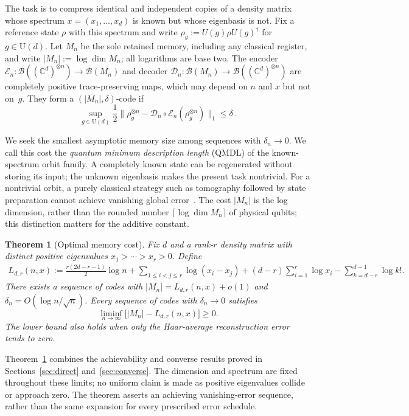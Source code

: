 \documentclass[a4paper,onecolumn,11pt]{quantumarticle}
\newtheorem{thm}{Theorem}
\def\D{\mathcal{D}}
\def\E{\mathcal{E}}
\begin{document}
The task is to compress identical and independent copies of a density matrix whose spectrum $x=(x_1,\ldots,x_d)$ is known but whose eigenbasis is not. Fix a reference state $\rho$ with this spectrum and write $\rho_g:=U(g)\rho U(g)^\dagger$ for $g\in\mathrm U(d)$. Let $M_n$ be the sole retained memory, including any classical register, and write $|M_n|:=\log\dim M_n$; all logarithms are base two. The encoder $\E_n:\mathcal B((\mathbb C^d)^{\otimes n})\to\mathcal B(M_n)$ and decoder $\D_n:\mathcal B(M_n)\to\mathcal B((\mathbb C^d)^{\otimes n})$ are completely positive trace-preserving maps, which may depend on $n$ and $x$ but not on~$g$. They form a $(|M_n|,\delta)$-code if
\begin{equation}\label{eq:error}
   \sup_{g\in\mathrm U(d)}\frac12
   \|\rho_g^{\otimes n}-\D_n\circ\E_n(\rho_g^{\otimes n})\|_1\le\delta\ .
\end{equation} 

We seek the smallest asymptotic memory size among sequences with $\delta_n\to0$. We call this cost the \emph{quantum minimum description length} (QMDL) of the known-spectrum orbit family. A completely known state can be regenerated without storing its input; the unknown eigenbasis makes the present task nontrivial. For a nontrivial orbit, a purely classical strategy such as tomography followed by state preparation cannot achieve vanishing global error~\cite{yang2018compression}. The cost $|M_n|$ is the log dimension, rather than the rounded number $\lceil\log\dim M_n\rceil$ of physical qubits; this distinction matters for the additive constant.

\begin{thm}[Optimal memory cost]\label{thm:qmdl}
Fix $d$ and a rank-$r$ density matrix with distinct positive eigenvalues $x_1>\cdots>x_r>0$. Define
\begin{align}
L_{d,r}(n,x):=\frac{r(2d-r-1)}2\log n
+\sum_{1\le i<j\le r}\log(x_i-x_j)+(d-r)\sum_{i=1}^r\log x_i
-\sum_{k=d-r}^{d-1}\log k! .\label{eq:result}
\end{align}
There exists a sequence of codes with $|M_n|=L_{d,r}(n,x)+o(1)$ and $\delta_n=O(\log n/\sqrt n)$. Every sequence of codes with $\delta_n\to0$ satisfies
\[
\liminf_{n\to\infty}\bigl[|M_n|-L_{d,r}(n,x)\bigr]\ge0.
\]
The lower bound also holds when only the Haar-average reconstruction
error tends to zero.
\end{thm}
Theorem~\ref{thm:qmdl} combines the achievability and converse results proved in Sections~\ref{sec:direct} and~\ref{sec:converse}. The dimension and spectrum are fixed throughout these limits; no uniform claim is made as positive eigenvalues collide or approach zero. The theorem asserts an achieving vanishing-error sequence, rather than the same expansion for every prescribed error schedule.
\end{document}
